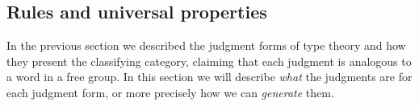 \documentclass[10pt]{article}
\def\m#1{\llbracket#1\rrbracket}
\def\refl{\mathsf{refl}}
\def\types{\vdash}
\def\Ctx{\mathbf{Ctx}}
\numberwithin{equation}{section}
\begin{document}





\subsection{Rules and universal properties}
\label{sec:rules}

In the previous section we described the judgment forms of type theory and how they present the classifying category, claiming that each judgment %
is analogous to a word in a free group.
In this section we will describe \emph{what} the judgments are for each judgment form, or more precisely how we can \emph{generate} them.
\end{document}
